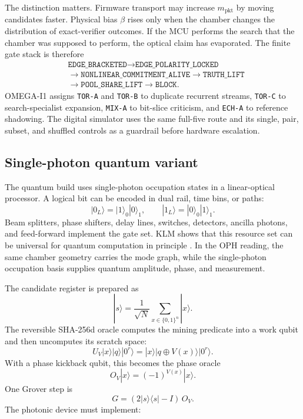 \documentclass[11pt]{article}
\theoremstyle{definition}
\theoremstyle{remark}
\newcommand{\bits}{\{0,1\}}
\begin{document}
The distinction matters. Firmware transport may increase \(m_{\mathrm{pkt}}\) by
moving candidates faster. Physical bias \(\beta\) rises only when the chamber
changes the distribution of exact-verifier outcomes. If the MCU
performs the search that the chamber was supposed to perform, the optical claim
has evaporated. The finite gate stack is therefore
\[
\begin{aligned}
&\texttt{EDGE\_BRACKETED}\to
\texttt{EDGE\_POLARITY\_LOCKED}\\
&\to \texttt{NONLINEAR\_COMMITMENT\_ALIVE}\to
\texttt{TRUTH\_LIFT}\\
&\to \texttt{POOL\_SHARE\_LIFT}\to \texttt{BLOCK}.
\end{aligned}
\]
OMEGA-I1 assigns \texttt{TOR-A} and \texttt{TOR-B} to duplicate recurrent
streams, \texttt{TOR-C} to search-specialist expansion, \texttt{MIX-A} to
bit-slice criticism, and \texttt{ECH-A} to reference shadowing. The digital
simulator uses the same full-five route and its single, pair, subset, and
shuffled controls as a guardrail before hardware escalation.

\subsection{Single-photon quantum variant}

The quantum build uses single-photon occupation states in a linear-optical
processor. A logical bit can be encoded in dual rail, time bins, or paths:
\[
|0_L\rangle=|1\rangle_0|0\rangle_1,\qquad
|1_L\rangle=|0\rangle_0|1\rangle_1.
\]
Beam splitters, phase shifters, delay lines, switches, detectors, ancilla
photons, and feed-forward implement the gate set. KLM shows that this resource
set can be universal for quantum computation in principle \cite{KLM2001}. In
the OPH reading, the same chamber geometry carries the mode graph, while the
single-photon occupation basis supplies quantum amplitude, phase, and
measurement.

The candidate register is prepared as
\[
|s\rangle=\frac{1}{\sqrt N}\sum_{x\in\bits^n}|x\rangle.
\]
The reversible SHA-256d oracle computes the mining predicate into a work qubit
and then uncomputes its scratch space:
\[
U_V|x\rangle|q\rangle|0^r\rangle
=|x\rangle|q\oplus V(x)\rangle|0^r\rangle.
\]
With a phase kickback qubit, this becomes the phase oracle
\[
O_V|x\rangle=(-1)^{V(x)}|x\rangle.
\]
One Grover step is
\[
G=(2|s\rangle\langle s|-I)\,O_V.
\]
The photonic device must implement:
\end{document}
